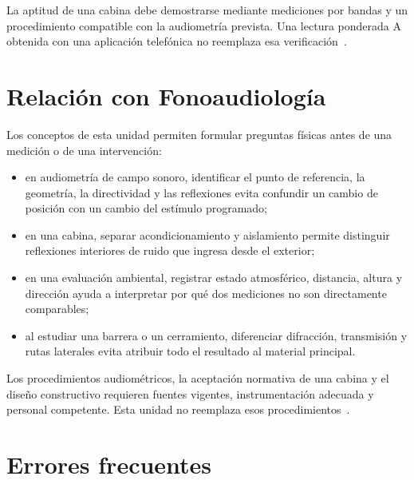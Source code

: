 La aptitud de una cabina debe demostrarse mediante mediciones por
bandas y un procedimiento compatible con la audiometría prevista. Una lectura
ponderada A obtenida con una aplicación telefónica no reemplaza esa
verificación~\cite{iso8253_1_2010,ansiS31_2023,iso8253_2_2009}.

\section{Relación con Fonoaudiología}
\label{sec:u9-fonoaudiologia}

Los conceptos de esta unidad permiten formular preguntas físicas antes de una
medición o de una intervención:

\begin{itemize}
    \item en audiometría de campo sonoro, identificar el punto de referencia,
    la geometría, la directividad y las reflexiones evita confundir un cambio
    de posición con un cambio del estímulo programado;
    \item en una cabina, separar acondicionamiento y aislamiento permite
    distinguir reflexiones interiores de ruido que ingresa desde el exterior;
    \item en una evaluación ambiental, registrar estado atmosférico, distancia,
    altura y dirección ayuda a interpretar por qué dos mediciones no son
    directamente comparables;
    \item al estudiar una barrera o un cerramiento, diferenciar difracción,
    transmisión y rutas laterales evita atribuir todo el resultado al material
    principal.
\end{itemize}

Los procedimientos audiométricos, la aceptación normativa de una
cabina y el diseño constructivo requieren fuentes vigentes, instrumentación
adecuada y personal competente. Esta unidad no reemplaza esos procedimientos~\cite{iso8253_1_2010,ansiS31_2023,iso8253_2_2009}.

\section{Errores frecuentes}
\label{sec:u9-errores}

